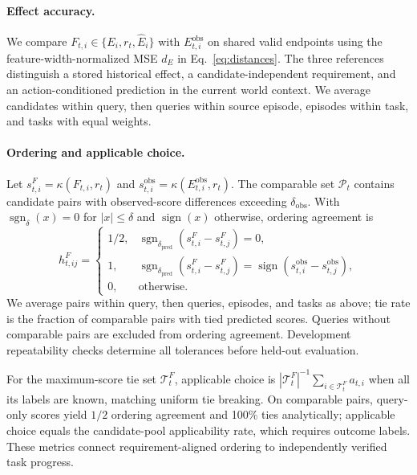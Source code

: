 \paragraph{Effect accuracy.}
We compare $F_{t,i}\in\{E_i,r_t,\widehat E_i\}$ with $E^{\mathrm{obs}}_{t,i}$ on shared valid endpoints using the feature-width-normalized MSE $d_E$ in Eq.~\eqref{eq:distances}.
The three references distinguish a stored historical effect, a candidate-independent requirement, and an action-conditioned prediction in the current world context.
We average candidates within query, then queries within source episode, episodes within task, and tasks with equal weights.

\paragraph{Ordering and applicable choice.}
Let $s^F_{t,i}=\kappa(F_{t,i},r_t)$ and $s^{\mathrm{obs}}_{t,i}=\kappa(E^{\mathrm{obs}}_{t,i},r_t)$.
The comparable set $\mathcal P_t$ contains candidate pairs with observed-score differences exceeding $\delta_{\mathrm{obs}}$.
With $\operatorname{sgn}_\delta(x)=0$ for $|x|\leq\delta$ and $\operatorname{sign}(x)$ otherwise, ordering agreement is
\begin{equation}
 h^F_{t,ij}=\begin{cases}
 1/2,&\operatorname{sgn}_{\delta_{\mathrm{pred}}}(s^F_{t,i}-s^F_{t,j})=0,\\
 1,&\operatorname{sgn}_{\delta_{\mathrm{pred}}}(s^F_{t,i}-s^F_{t,j})
       =\operatorname{sign}(s^{\mathrm{obs}}_{t,i}-s^{\mathrm{obs}}_{t,j}),\\
 0,&\text{otherwise}.
 \end{cases}
 \label{eq:tie_ordering}
\end{equation}
We average pairs within query, then queries, episodes, and tasks as above; tie rate is the fraction of comparable pairs with tied predicted scores.
Queries without comparable pairs are excluded from ordering agreement.
Development repeatability checks determine all tolerances before held-out evaluation.

For the maximum-score tie set $\mathcal T_t^F$, applicable choice is
$|\mathcal T_t^F|^{-1}\sum_{i\in\mathcal T_t^F}a_{t,i}$ when all its labels are known, matching uniform tie breaking.
On comparable pairs, query-only scores yield $1/2$ ordering agreement and 100\% ties analytically; applicable choice equals the candidate-pool applicability rate, which requires outcome labels.
These metrics connect requirement-aligned ordering to independently verified task progress.

